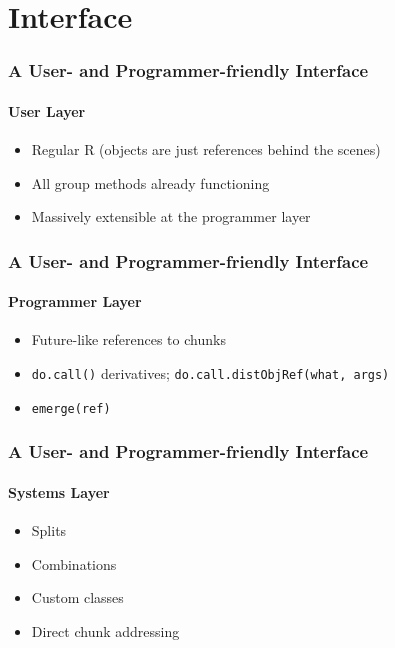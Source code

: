 \documentclass[handout]{beamer}
\begin{document}
\section{Interface}
	\begin{frame}
		\frametitle{A User- and Programmer-friendly Interface}
		\framesubtitle{User Layer}
		\begin{itemize}
			\item Regular R (objects are just references behind the scenes)
			\item All group methods already functioning
			\item Massively extensible at the programmer layer
		\end{itemize}
	\end{frame}
	\begin{frame}
		\frametitle{A User- and Programmer-friendly Interface}
		\framesubtitle{Programmer Layer}
		\begin{itemize}
			\item Future-like references to chunks
			\item \texttt{do.call()} derivatives;
				\texttt{do.call.distObjRef(what, args)}
			\item \texttt{emerge(ref)}
		\end{itemize}
	\end{frame}
	\begin{frame}
		\frametitle{A User- and Programmer-friendly Interface}
		\framesubtitle{Systems Layer}
		\begin{itemize}
			\item Splits
			\item Combinations
			\item Custom classes 
			\item Direct chunk addressing
		\end{itemize}
	\end{frame}
\end{document}
